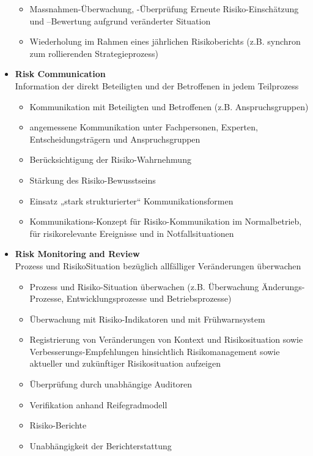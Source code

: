 \documentclass[10pt,a4paper]{article}
\begin{document}
\begin{itemize}[noitemsep,topsep=0pt,leftmargin=*]
\begin{itemize}[noitemsep,topsep=0pt,leftmargin=*]
        \item Massnahmen-Überwachung, -Überprüfung Erneute Risiko-Einschätzung und –Bewertung aufgrund veränderter Situation
        \item Wiederholung im Rahmen eines jährlichen Risikoberichts (z.B. synchron zum rollierenden Strategieprozess)
    \end{itemize}
    \item \textbf{Risk Communication}\\Information der direkt Beteiligten und der Betroffenen in jedem Teilprozess
    \begin{itemize}[noitemsep,topsep=0pt,leftmargin=*]
        \item Kommunikation mit Beteiligten und Betroffenen (z.B. Anspruchsgruppen)
        \item angemessene Kommunikation unter Fachpersonen, Experten, Entscheidungsträgern und Anspruchsgruppen
        \item Berücksichtigung der Risiko-Wahrnehmung
        \item Stärkung des Risiko-Bewusstseins
        \item Einsatz „stark strukturierter“ Kommunikationsformen
        \item Kommunikations-Konzept für Risiko-Kommunikation im Normalbetrieb, für risikorelevante Ereignisse und in Notfallsituationen
    \end{itemize}

    \pagebreak
    \item \textbf{Risk Monitoring and Review}\\Prozess und RisikoSituation bezüglich allfälliger Veränderungen überwachen
    \begin{itemize}[noitemsep,topsep=0pt,leftmargin=*]
        \item Prozess und Risiko-Situation überwachen (z.B. Überwachung Änderungs-Prozesse, Entwicklungsprozesse und Betriebsprozesse)
        \item Überwachung mit Risiko-Indikatoren und mit Frühwarnsystem
        \item Registrierung von Veränderungen von Kontext und Risikosituation sowie Verbesserungs-Empfehlungen hinsichtlich Risikomanagement sowie aktueller und zukünftiger Risikosituation aufzeigen
        \item Überprüfung durch unabhängige Auditoren
        \item Verifikation anhand Reifegradmodell
        \item Risiko-Berichte
        \item Unabhängigkeit der Berichterstattung
    \end{itemize}
\end{itemize}
\end{document}
